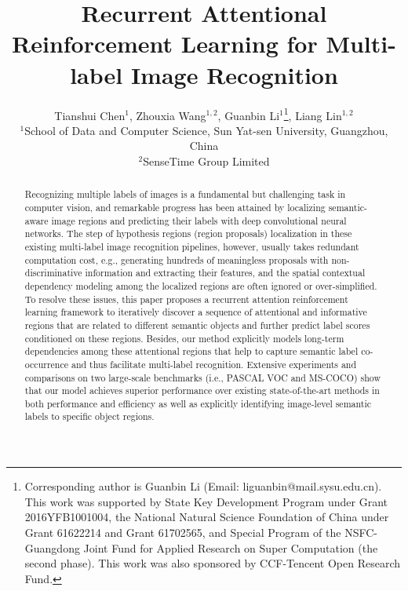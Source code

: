 \documentclass[letterpaper]{article} %
\begin{document}
\title{Recurrent Attentional Reinforcement Learning for Multi-label Image Recognition}
\author{Tianshui Chen$^1$, Zhouxia Wang$^{1,2}$, Guanbin Li$^{1}$\thanks{Corresponding author is Guanbin Li (Email: liguanbin@mail.sysu.edu.cn). This work was supported by State Key Development Program under Grant 2016YFB1001004, the National Natural
Science Foundation of China under Grant 61622214 and Grant 61702565, and Special Program of the NSFC-Guangdong Joint Fund for Applied Research on Super Computation (the second phase). This work was also sponsored by CCF-Tencent Open Research Fund.}, Liang Lin$^{1,2}$\\
$^1$School of Data and Computer Science, Sun Yat-sen University, Guangzhou, China\\
$^2$SenseTime Group Limited\\
}
\maketitle

\begin{abstract}
Recognizing multiple labels of images is a fundamental but challenging task in computer vision, and remarkable progress has been attained by localizing semantic-aware image regions and predicting their labels with deep convolutional neural networks. The step of hypothesis regions (region proposals) localization in these existing multi-label image recognition pipelines, however, usually takes redundant computation cost, e.g., generating hundreds of meaningless proposals with non-discriminative information and extracting their features, and the spatial contextual dependency modeling among the localized regions are often ignored or over-simplified. To resolve these issues, this paper proposes a recurrent attention reinforcement learning framework to iteratively discover a sequence of attentional and informative regions that are related to different semantic objects and further predict label scores conditioned on these regions. Besides, our method explicitly models long-term dependencies among these attentional regions that help to capture semantic label co-occurrence and thus facilitate multi-label recognition. Extensive experiments and comparisons on two large-scale benchmarks (i.e., PASCAL VOC and MS-COCO) show that our model achieves superior performance over existing state-of-the-art methods in both performance and efficiency as well as explicitly identifying image-level semantic labels to specific object regions.
\end{abstract}
\end{document}
